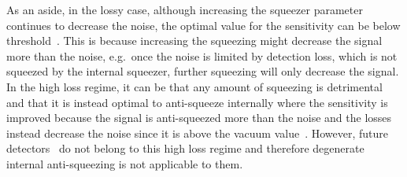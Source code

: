 As an aside, in the lossy case, although increasing the squeezer parameter continues to decrease the noise, the optimal value for the sensitivity can be below threshold~\cite{korobkoCompensatingQuantumDecoherenceTalk2021}. This is because increasing the squeezing might decrease the signal more than the noise, e.g.\ once the noise is limited by detection loss, which is not squeezed by the internal squeezer, further squeezing will only decrease the signal. In the high loss regime, it can be that any amount of squeezing is detrimental and that it is instead optimal to anti-squeeze internally where the sensitivity is improved because the signal is anti-squeezed more than the noise and the losses instead decrease the noise since it is above the vacuum value~\cite{korobkoCompensatingQuantumDecoherenceTalk2021}. However, future detectors~\cite{} do not belong to this high loss regime and therefore degenerate internal anti-squeezing is not applicable to them. %


